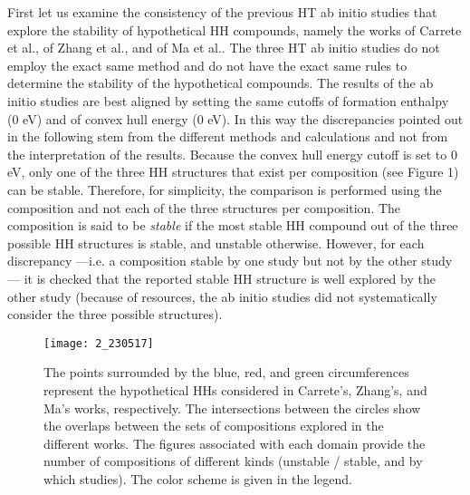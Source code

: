 \documentclass[pt10,journal=jacsat,manuscript=article,layout=twocolumn]{achemso}
\begin{document}
First let us examine the consistency of the previous HT ab initio studies that explore the stability of hypothetical HH compounds, namely the works of Carrete et al.\cite{FindingUnprecedentedly}, of Zhang et al.\cite{SortingStable}, and of Ma et al.\cite{Computationalinvestigation}. The three HT ab initio studies do not employ the exact same method and do not have the exact same rules to determine the stability of the hypothetical compounds. The results of the ab initio studies are best aligned by setting the same cutoffs of formation enthalpy (0 eV) and of convex hull energy (0 eV). In this way the discrepancies pointed out in the following stem from the different methods and calculations and not from the interpretation of the results.
Because the convex hull energy cutoff is set to 0 eV, only one of the three HH structures that exist per composition (see Figure 1) can be stable. Therefore, for simplicity, the comparison is performed using the composition and not each of the three structures per composition. The composition is said to be \textit{stable} if the most stable HH compound out of the three possible HH structures is stable, and unstable otherwise.
However, for each discrepancy ---i.e. a composition stable by one study but not by the other study--- it is checked that the reported stable HH structure is well explored by the other study (because of resources, the ab initio studies did not systematically consider the three possible structures).

\begin{figure}
\texttt{[image: 2\_230517]}

\caption{The points surrounded by the blue, red, and green circumferences represent the hypothetical HHs considered in Carrete's, Zhang's, and Ma's works, respectively. The intersections between the circles show the overlaps between the sets of compositions explored in the different works. The figures associated with each domain provide the number of compositions of different kinds (unstable / stable, and by which studies). The color scheme is given in the legend.}

\end{figure}
\end{document}
